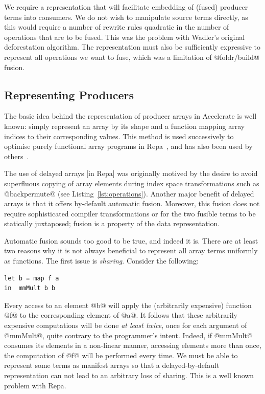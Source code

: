 We require a representation that will facilitate embedding of (fused) producer
terms into consumers. We do not wish to manipulate source terms directly, as
this would require a number of rewrite rules quadratic in the number of
operations that are to be fused. This was the problem with Wadler's original
deforestation algorithm. The representation must also be sufficiently expressive
to represent all operations we want to fuse, which was a limitation of
@foldr/build@ fusion.


\subsection{Representing Producers}
\label{sec:representing_producers}

The basic idea behind the representation of producer arrays in Accelerate is
well known: simply represent an array by its shape and a function mapping array
indices to their corresponding values. This method is used successively to
optimise purely functional array programs in Repa~\cite{Keller:2010er}, and has also been used by
others~\cite{Claessen:2012hl}.

The use of delayed arrays [in Repa] was originally motived by the desire to
avoid superfluous copying of array elements during index space transformations
such as @backpermute@ (see Listing~\ref{lst:operations}). Another major
benefit of delayed arrays is that it offers by-default automatic fusion.
Moreover, this fusion does not require sophisticated compiler transformations or
for the two fusible terms to be statically juxtaposed; fusion is a property of
the data representation.

Automatic fusion sounds too good to be true, and indeed it is. There are at
least two reasons why it is not always beneficial to represent all array terms
uniformly as functions. The first issue is \emph{sharing}. Consider the
following:
%
\begin{lstlisting}[style=haskell]
let b = map f a
in  mmMult b b
\end{lstlisting}
%
Every access to an element @b@ will apply the (arbitrarily expensive)
function @f@ to the corresponding element of @a@. It follows that
these arbitrarily expensive computations will be done \emph{at least twice},
once for each argument of @mmMult@, quite contrary to the programmer's
intent. Indeed, if @mmMult@ consumes its elements in a non-linear manner,
accessing elements more than once, the computation of @f@ will be performed
every time. We must be able to represent some terms as manifest arrays so that a
delayed-by-default representation can not lead to an arbitrary loss of sharing.
This is a well known problem with Repa.

